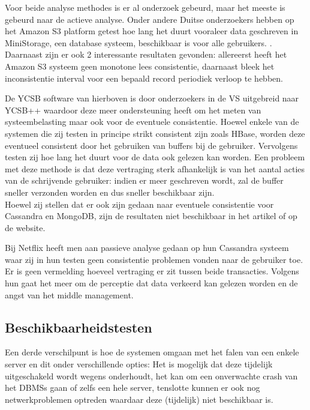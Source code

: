 Voor beide analyse methodes is er al onderzoek gebeurd, maar het meeste is gebeurd naar de actieve analyse. Onder andere Duitse onderzoekers hebben op het Amazon S3 platform getest hoe lang het duurt vooraleer data geschreven in MiniStorage, een database systeem, beschikbaar is voor alle gebruikers. \cite{bermbach2011eventual}. \\
Daarnaast zijn er ook 2 interessante resultaten gevonden: allereerst heeft het Amazon S3 systeem geen monotone lees consistentie, daarnaast bleek het inconsistentie interval voor een bepaald record periodiek verloop te hebben. 

De YCSB software van hierboven is door onderzoekers in de VS uitgebreid naar YCSB++\cite{patil2011ycsb++} waardoor deze meer ondersteuning heeft om het meten van systeembelasting maar ook voor de eventuele consistentie. Hoewel enkele van de systemen die zij testen in principe strikt consistent zijn zoals HBase, worden deze eventueel consistent door het gebruiken van buffers bij de gebruiker. Vervolgens testen zij hoe lang het duurt voor de data ook gelezen kan worden. Een probleem met deze methode is dat deze vertraging sterk afhankelijk is van het aantal acties van de schrijvende gebruiker: indien er meer geschreven wordt, zal de buffer sneller verzonden worden en dus sneller beschikbaar zijn. \\
Hoewel zij stellen dat er ook zijn gedaan naar eventuele consistentie voor Cassandra en MongoDB, zijn de resultaten niet beschikbaar in het artikel of op de website. 

Bij Netflix heeft men aan passieve analyse gedaan op hun Cassandra systeem \cite{kalantzisnetflix} waar zij in hun testen geen consistentie problemen vonden naar de gebruiker toe. Er is geen vermelding hoeveel vertraging er zit tussen beide transacties. Volgens hun gaat het meer om de perceptie dat data verkeerd kan gelezen worden en de angst van het middle management. 

\subsection{Beschikbaarheidstesten} 
Een derde verschilpunt is hoe de systemen omgaan met het falen van een enkele server en dit onder verschillende opties: Het is mogelijk dat deze tijdelijk uitgeschakeld wordt wegens onderhoudt, het kan om een onverwachte crash van het \glspl{DBMS} gaan of zelfs een hele server, tenslotte kunnen er ook nog netwerkproblemen optreden waardaar deze (tijdelijk) niet beschikbaar is. 

